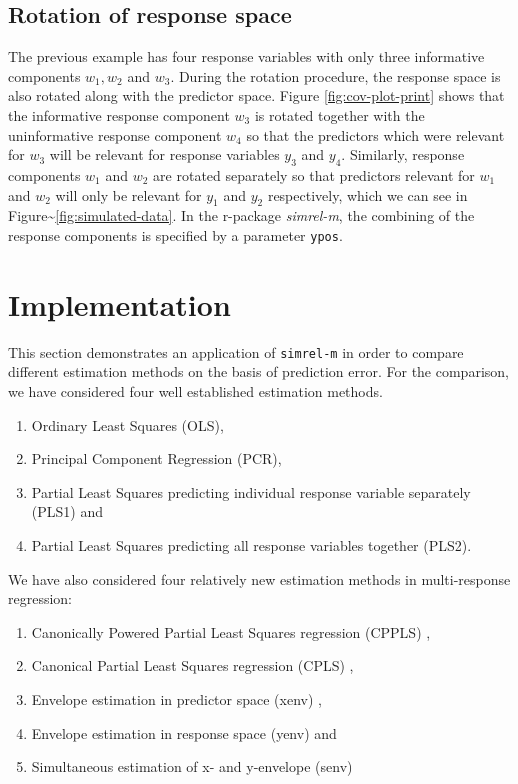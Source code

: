 \documentclass[3p,times,12pt,authoryear]{elsarticle}
\providecommand{\tightlist}{%
  \setlength{\itemsep}{0pt}\setlength{\parskip}{0pt}}
\theoremstyle{definition}
\theoremstyle{definition}
\theoremstyle{remark}
\begin{document}
\hypertarget{rotation-of-response-space}{\subsection{Rotation of
response space}\label{rotation-of-response-space}}

The previous example has four response variables with only three
informative components \(w_1, w_2\) and \(w_3\). During the rotation
procedure, the response space is also rotated along with the predictor
space. Figure \ref{fig:cov-plot-print} shows that the informative
response component \(w_3\) is rotated together with the uninformative
response component \(w_4\) so that the predictors which were relevant
for \(w_3\) will be relevant for response variables \(y_3\) and \(y_4\).
Similarly, response components \(w_1\) and \(w_2\) are rotated
separately so that predictors relevant for \(w_1\) and \(w_2\) will only
be relevant for \(y_1\) and \(y_2\) respectively, which we can see in
Figure\textasciitilde{}\ref{fig:simulated-data}. In the r-package
\emph{simrel-m}, the combining of the response components is specified
by a parameter \texttt{ypos}.

\hypertarget{implementation}{\section{Implementation}\label{implementation}}

This section demonstrates an application of \texttt{simrel-m} in order
to compare different estimation methods on the basis of prediction
error. For the comparison, we have considered four well established
estimation methods.

\begin{enumerate}
\def\labelenumi{\alph{enumi})}
\tightlist
\item
  Ordinary Least Squares (OLS),
\item
  Principal Component Regression (PCR),
\item
  Partial Least Squares predicting individual response variable
  separately (PLS1) and
\item
  Partial Least Squares predicting all response variables together
  (PLS2).
\end{enumerate}

We have also considered four relatively new estimation methods in
multi-response regression:

\begin{enumerate}
\def\labelenumi{\alph{enumi})}
\tightlist
\item
  Canonically Powered Partial Least Squares regression (CPPLS)
  \citep{indahl2009canonical},
\item
  Canonical Partial Least Squares regression (CPLS)
  \citep{indahl2009canonical},
\item
  Envelope estimation in predictor space (xenv)
  \citep{cook2010envelope},
\item
  Envelope estimation in response space (yenv)
  \citep{cook2015foundations} and
\item
  Simultaneous estimation of x- and y-envelope (senv)
  \citep{cook2015simultaneous}
\end{enumerate}
\end{document}
